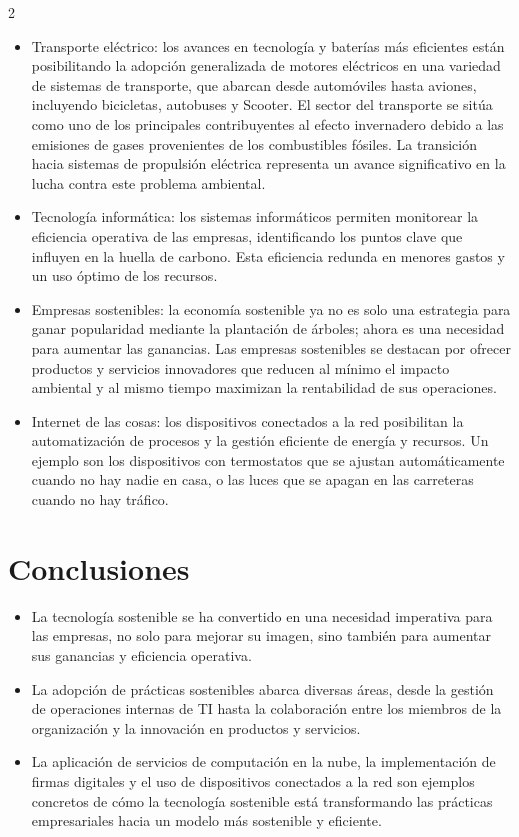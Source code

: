 \documentclass[12pt,spanish,Letterpaper,openany]{book}
\begin{document}
\begin {multicols}{2}
\begin{itemize}
\item
  Transporte eléctrico: los avances en tecnología y baterías más eficientes están posibilitando la adopción generalizada de motores eléctricos en una variedad de sistemas de transporte, que abarcan desde automóviles hasta aviones, incluyendo bicicletas, autobuses y Scooter. El sector del transporte se sitúa como uno de los principales contribuyentes al efecto invernadero debido a las emisiones de gases provenientes de los combustibles fósiles. La transición hacia sistemas de propulsión eléctrica representa un avance significativo en la lucha contra este problema ambiental.
\item
  Tecnología informática: los sistemas informáticos permiten monitorear la eficiencia operativa de las empresas, identificando los puntos clave que influyen en la huella de carbono. Esta eficiencia redunda en menores gastos y un uso óptimo de los recursos.
\item
  Empresas sostenibles: la economía sostenible ya no es solo una estrategia para ganar popularidad mediante la plantación de árboles; ahora es una necesidad para aumentar las ganancias. Las empresas sostenibles se destacan por ofrecer productos y servicios innovadores que reducen al mínimo el impacto ambiental y al mismo tiempo maximizan la rentabilidad de sus operaciones.
\item
  Internet de las cosas: los dispositivos conectados a la red posibilitan la automatización de procesos y la gestión eficiente de energía y recursos. Un ejemplo son los dispositivos con termostatos que se ajustan automáticamente cuando no hay nadie en casa, o las luces que se apagan en las carreteras cuando no hay tráfico.
\end{itemize}

\bigskip
\bigskip
\bigskip
\bigskip
\bigskip

\hypertarget{conclusiones-7}{%
\section{Conclusiones}\label{conclusiones-7}}

\begin{itemize}
\item
  La tecnología sostenible se ha convertido en una necesidad imperativa para las empresas, no solo para mejorar su imagen, sino también para aumentar sus ganancias y eficiencia operativa.
\item
  La adopción de prácticas sostenibles abarca diversas áreas, desde la gestión de operaciones internas de TI hasta la colaboración entre los miembros de la organización y la innovación en productos y servicios.
\item
  La aplicación de servicios de computación en la nube, la implementación de firmas digitales y el uso de dispositivos conectados a la red son ejemplos concretos de cómo la tecnología sostenible está transformando las prácticas empresariales hacia un modelo más sostenible y eficiente.
\end{itemize}


\end{multicols}
\end{document}
